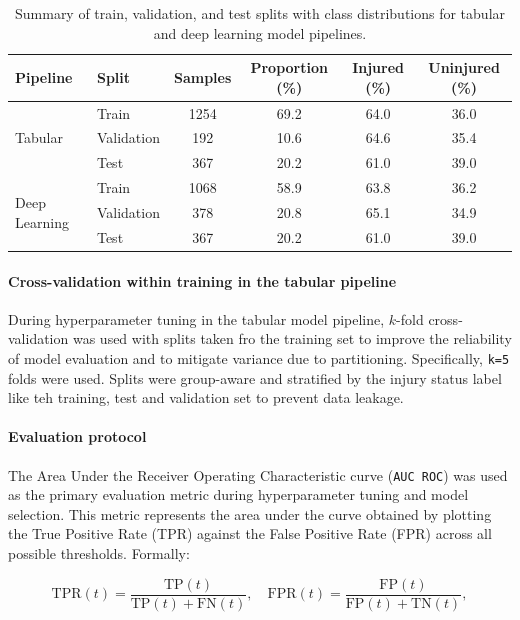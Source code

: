 \begin{table}[htbp]
    \centering
    \caption[Train-Test-Validation Split and Class Distribution]{Summary of train, validation, and test splits with class distributions for tabular and deep learning model pipelines.}
    \label{tab:met-data-splits}
    \begin{tabular}{llcccc}
    \hline
    \textbf{Pipeline} & \textbf{Split} & \textbf{Samples} & \textbf{Proportion (\%)} & \textbf{Injured (\%)} & \textbf{Uninjured (\%)} \\
    \hline
    \multirow{3}{*}{Tabular}
      & Train & 1254 & 69.2 & 64.0 & 36.0 \\
      & Validation & 192 & 10.6 & 64.6 & 35.4 \\
      & Test & 367 & 20.2 & 61.0 & 39.0 \\
    \hline
    \multirow{3}{*}{Deep Learning}
      & Train & 1068 & 58.9 & 63.8 & 36.2 \\
      & Validation & 378 & 20.8 & 65.1 & 34.9 \\
      & Test & 367 & 20.2 & 61.0 & 39.0 \\
    \hline
    \end{tabular}
\end{table}


\paragraph{Cross-validation within training in the tabular pipeline}
During hyperparameter tuning in the tabular model pipeline, $k$-fold cross-validation was used with splits taken fro the training set to improve the reliability of model evaluation and to mitigate variance due to partitioning. Specifically, \texttt{k=5} folds were used. Splits were group-aware and stratified by the injury status label like teh training, test and validation set to prevent data leakage.

\paragraph{Evaluation protocol}
The Area Under the Receiver Operating Characteristic curve (\texttt{AUC ROC}) was used as the primary evaluation metric during hyperparameter tuning and model selection. This metric represents the area under the curve obtained by plotting the True Positive Rate (TPR) against the False Positive Rate (FPR) across all possible thresholds. Formally:

\begin{equation}
    \mathrm{TPR}(t)=\frac{\mathrm{TP}(t)}{\mathrm{TP}(t)+\mathrm{FN}(t)},\quad
    \mathrm{FPR}(t)=\frac{\mathrm{FP}(t)}{\mathrm{FP}(t)+\mathrm{TN}(t)},
\end{equation}

